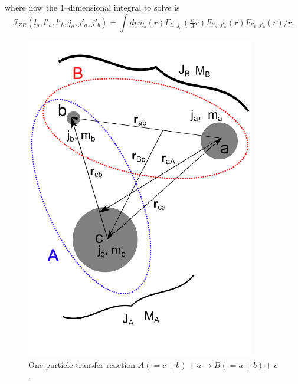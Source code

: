 where now the 1--dimensional integral to solve is
\begin{equation}\label{eqC6AppG56}
\mathcal I_{ZR}(l_a,l'_a,l'_b,j_a,j'_a,j'_b)=\int dr u_{l_b}(r)F_{l_a,j_a}(\tfrac{c}{A}r)  F_{l'_a,j'_a}(r)F_{l'_b,j'_b}(r)/r.
\end{equation}
 \begin{figure}
\centerline{\includegraphics*[width=10cm,angle=0]{C6/figs_C6/onept.pdf}}
\vspace{-1cm}
\caption{One particle transfer reaction $A(=c+b)+a\rightarrow B(=a+b)+c$.}\label{fig6G4}
\end{figure}
